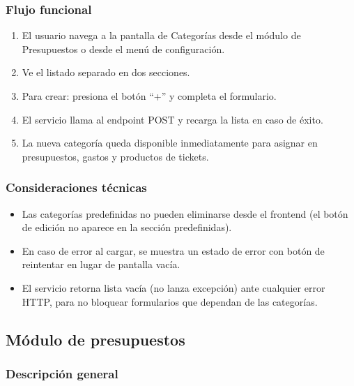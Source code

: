 \subsubsection{Flujo funcional}

\begin{enumerate}
  \item El usuario navega a la pantalla de Categorías desde el módulo de
        Presupuestos o desde el menú de configuración.
  \item Ve el listado separado en dos secciones.
  \item Para crear: presiona el botón ``+'' y completa el formulario.
  \item El servicio llama al endpoint POST y recarga la lista en caso de
        éxito.
  \item La nueva categoría queda disponible inmediatamente para asignar
        en presupuestos, gastos y productos de tickets.
\end{enumerate}

\subsubsection{Consideraciones técnicas}

\begin{itemize}
  \item Las categorías predefinidas no pueden eliminarse desde el
        frontend (el botón de edición no aparece en la sección
        predefinidas).
  \item En caso de error al cargar, se muestra un estado de error con
        botón de reintentar en lugar de pantalla vacía.
  \item El servicio retorna lista vacía (no lanza excepción) ante
        cualquier error HTTP, para no bloquear formularios que dependan
        de las categorías.
\end{itemize}


\subsection{Módulo de presupuestos}

\subsubsection{Descripción general}

